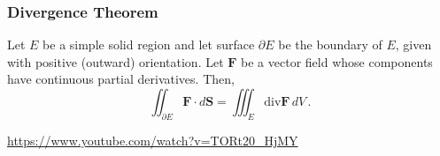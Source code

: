 \documentclass[aspectratio=169]{beamer}
\begin{document}
\begin{frame}
    \frametitle{Divergence Theorem}
    \begin{theorem}
Let \(E\) be a simple solid region and let surface \(\partial E\) be the boundary of \(E\),
given with positive (outward) orientation.
Let \(\mathbf{F}\) be a vector field whose components have continuous partial derivatives.
Then,
\begin{equation*}
    \iint_{\partial E} \mathbf{F} \cdot d\mathbf{S} = \iiint_E \mathrm{div} \mathbf{F} \, dV \,.
\end{equation*}
\end{theorem}

\url{https://www.youtube.com/watch?v=TORt20_HjMY}

\end{frame}
\end{document}
